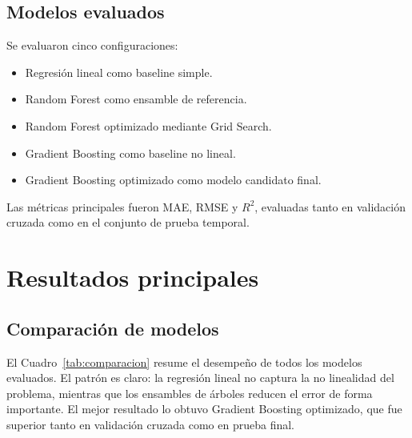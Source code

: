 \documentclass[12pt,a4paper]{article}
\begin{document}
\subsection{Modelos evaluados}

Se evaluaron cinco configuraciones:

\begin{itemize}
    \item Regresi\'on lineal como baseline simple.
    \item Random Forest como ensamble de referencia.
    \item Random Forest optimizado mediante Grid Search.
    \item Gradient Boosting como baseline no lineal.
    \item Gradient Boosting optimizado como modelo candidato final.
\end{itemize}

Las m\'etricas principales fueron MAE, RMSE y $R^2$, evaluadas tanto en validaci\'on cruzada como en el conjunto de prueba temporal.

\section{Resultados principales}

\subsection{Comparaci\'on de modelos}

El Cuadro~\ref{tab:comparacion} resume el desempe\~no de todos los modelos evaluados. El patr\'on es claro: la regresi\'on lineal no captura la no linealidad del problema, mientras que los ensambles de \'arboles reducen el error de forma importante. El mejor resultado lo obtuvo Gradient Boosting optimizado, que fue superior tanto en validaci\'on cruzada como en prueba final.
\end{document}
